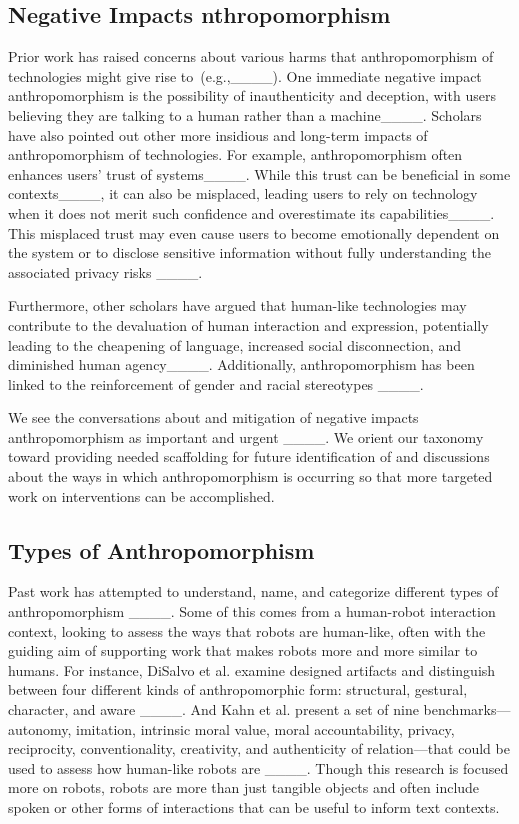 \subsection{Negative Impacts  nthropomorphism } \label{RWharms}
Prior work has raised concerns about various harms that anthropomorphism of technologies might give rise to~(e.g.,____). One immediate negative impact  anthropomorphism  is the possibility of inauthenticity and deception, with users believing they are talking to a human rather than a machine____. %
%
Scholars have also pointed out other more insidious and long-term impacts of anthropomorphism of technologies. For example, anthropomorphism  often enhances users' trust of systems____. While this trust can be beneficial in some contexts____, it can also be misplaced, leading users to rely on technology when it does not merit such confidence and overestimate its capabilities____. This misplaced trust may even cause users to become emotionally dependent on the system or to disclose sensitive information without fully understanding the associated privacy risks ____. 

Furthermore, other scholars have argued that human-like technologies may contribute to the devaluation of human interaction and expression, potentially leading to the cheapening of language, increased social disconnection, and diminished human agency____. Additionally, anthropomorphism has been linked to the reinforcement of gender and racial stereotypes ____.

We see the conversations about and mitigation of negative impacts  anthropomorphism  as important and urgent ____. We orient our taxonomy toward providing needed scaffolding for future identification of and discussions about the ways in which anthropomorphism is occurring so that more targeted work on interventions can be accomplished.


\subsection{Types of Anthropomorphism }
Past work has attempted to understand, name, and categorize different types of anthropomorphism ____. Some of this comes from a human-robot interaction context, looking to assess the ways that robots are human-like, often with the guiding aim of supporting work that makes robots more and more similar to humans. For instance, DiSalvo et al. examine designed artifacts and distinguish between four different kinds of anthropomorphic form: structural, gestural, character, and aware ____. And Kahn et al. present a set of nine benchmarks---autonomy, imitation, intrinsic moral value, moral accountability, privacy, reciprocity, conventionality, creativity, and authenticity of relation---that could be used to assess how human-like robots are ____. Though this research is focused more on robots, robots are more than just tangible objects and often include spoken or other forms of interactions that can be useful to inform text contexts.

